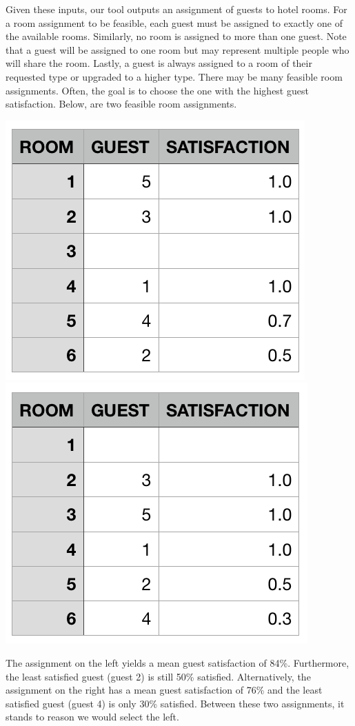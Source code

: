 \documentclass[11 pt]{article}
\begin{document}
\par Given these inputs, our tool outputs an assignment of guests to hotel rooms. For a room assignment to be feasible, each guest must be assigned to exactly one of the available rooms. Similarly, no room is assigned to more than one guest. Note that a guest will be assigned to one room but may represent multiple people who will share the room. Lastly, a guest is always assigned to a room of their requested type or upgraded to a higher type. There may be many feasible room assignments. Often, the goal is to choose the one with the highest guest satisfaction. Below, are two feasible room assignments.
\begin{center}
\includegraphics[scale=0.6]{images/optMeanAssign.png} \qquad
\includegraphics[scale=0.6]{images/bestAssign.png}
\end{center}
\par The assignment on the left yields a mean guest satisfaction of 84\%. Furthermore, the least satisfied guest (guest 2) is still 50\% satisfied. Alternatively, the assignment on the right has a mean guest satisfaction of 76\% and the least satisfied guest (guest 4) is only 30\% satisfied. Between these two assignments, it stands to reason we would select the left.
\end{document}

